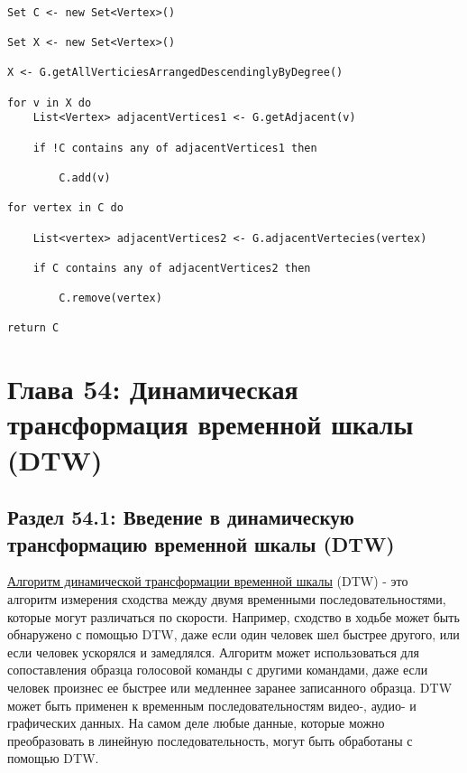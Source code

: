 \begin{tcolorbox}
\begin{verbatim}

Set C <- new Set<Vertex>()

Set X <- new Set<Vertex>()

X <- G.getAllVerticiesArrangedDescendinglyByDegree()

for v in X do
	List<Vertex> adjacentVertices1 <- G.getAdjacent(v)
	
	if !C contains any of adjacentVertices1 then

		C.add(v)
		
for vertex in C do

	List<vertex> adjacentVertices2 <- G.adjacentVertecies(vertex)
	
	if C contains any of adjacentVertices2 then

		C.remove(vertex)

return C

\end{verbatim}
\end{tcolorbox}


\vspace{\baselineskip}
\vspace{-0.2cm}

\chapter*{Глава 54:  Динамическая трансформация временной шкалы (DTW)}
\section*{Раздел 54.1: Введение в динамическую трансформацию временной шкалы (DTW)}

\href{https://en.wikipedia.org/wiki/Dynamic_time_warping}{\underline{Алгоритм динамической трансформации временной шкалы}} (DTW) - это алгоритм измерения сходства между двумя временными последовательностями, которые могут различаться по скорости. Например, сходство в ходьбе может быть обнаружено с помощью DTW, даже если один человек шел быстрее другого, или если человек ускорялся и замедлялся. Алгоритм может использоваться для сопоставления образца голосовой команды с другими командами, даже если человек произнес ее быстрее или медленнее заранее записанного образца. DTW может быть применен к временным последовательностям видео-, аудио- и графических данных. На самом деле любые данные, которые можно преобразовать в линейную последовательность, могут быть обработаны с помощью DTW.


